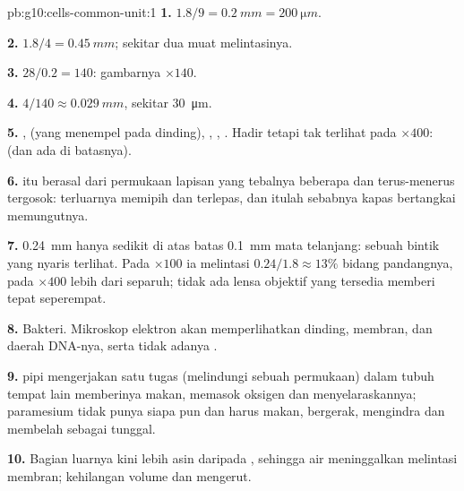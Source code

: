 \begin{solution}{pb:g10:cells-common-unit:1}
\textbf{1.} $1.8/9 = \qty{0.2}{mm} = \qty{200}{\micro m}$.

\textbf{2.} $1.8/4 = \qty{0.45}{mm}$; sekitar dua  muat melintasinya.

\textbf{3.} $28/0.2 = 140$: gambarnya $\times 140$.

\textbf{4.} $4/140 \approx \qty{0.029}{mm}$, sekitar \qty{30}{\micro m}.

\textbf{5.} ,  (yang menempel pada dinding),
, , . Hadir tetapi tak terlihat pada
$\times 400$:  (dan  ada di batasnya).

\textbf{6.}  itu berasal dari permukaan lapisan yang tebalnya
beberapa  dan terus-menerus tergosok:  terluarnya memipih dan
terlepas, dan itulah sebabnya kapas bertangkai memungutnya.

\textbf{7.} \qty{0.24}{mm} hanya sedikit di atas batas
\qty{0.1}{mm} mata telanjang: sebuah bintik yang nyaris terlihat. Pada
$\times 100$ ia melintasi $0.24/1.8 \approx 13\%$ bidang pandangnya,
pada $\times 400$ lebih dari separuh; tidak ada lensa objektif yang
tersedia memberi tepat seperempat.

\textbf{8.} Bakteri. Mikroskop elektron akan memperlihatkan dinding,
membran,  dan daerah DNA-nya, serta tidak adanya .

\textbf{9.}  pipi mengerjakan satu tugas (melindungi sebuah
permukaan) dalam tubuh tempat  lain memberinya makan, memasok
oksigen dan menyelaraskannya; paramesium tidak punya siapa pun dan
harus makan, bergerak, mengindra dan membelah sebagai  tunggal.

\textbf{10.} Bagian luarnya kini lebih asin daripada ,
sehingga air meninggalkan  melintasi membran;  kehilangan
volume dan mengerut.


\end{solution}
